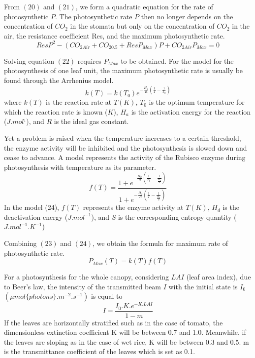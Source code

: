 \documentclass[a4paper]{article}
\begin{document}
From $(20)$ and $(21)$, we form a quadratic equation for the rate of photosynthetic $P$. The photosynthetic rate $P$ then no longer depends on the concentration of $CO_2$ in the stomata but only on the concentration of $CO_2$ in the air, the resistance coefficient Res, and the maximum photosynthetic rate.
\begin{equation}
  ResP^2 - (CO_{2Air} + CO_{2 0.5} + ResP_{Max})P + CO_{2Air}P_{Max} = 0
\end{equation}

Solving equation $(22)$ requires $P_{Max}$ to be obtained. For the model for the photosynthesis of one leaf unit, the maximum photosynthetic rate is usually be found through the Arrhenius model.
\begin{equation}
  k(T) = k(T_0)e^{-\frac{H_a}{R}(\frac{1}{T} - \frac{1}{T_0})}
\end{equation}
where $k(T)$ is the reaction rate at $T (K)$, $T_0$ is the optimum temperature for which the reaction
rate is known ($K$), $H_a$ is the activation energy for the reaction ($J.mol^{_1}$), and $R$ is the ideal gas constant.

Yet a problem is raised when the temperature increases to a certain threshold, the enzyme activity will be inhibited and the photosynthesis is slowed down and cease to advance. A model represents the activity of the Rubisco enzyme during photosynthesis with temperature as its parameter.
\begin{equation}
  f(T) = \frac{1 + e^{-\frac{H_d}{R}( \frac{1}{T_0} - \frac{1}{\frac{H_d}{S}} )}}{1 + e^{-\frac{H_d}{R}(\frac{1}{T} - \frac{1}{\frac{H_d}{S}})}}
\end{equation}
In the model (24), $f(T)$ represents the enzyme activity at $T (K)$, $H_d$ is the deactivation energy ($J.mol^{-1}$), and $S$ is the corresponding entropy quantity ($J.mol^{-1}.K^{-1}$)

Combining $(23)$ and $(24)$, we obtain the formula for maximum rate of photosynthetic rate.
\begin{equation}
  P_{Max}(T) = k(T)f(T)
\end{equation}

For a photosynthesis for the whole canopy, considering $LAI$ (leaf area index), due to Beer's law, the intensity of the transmitted beam $I$ with the initial state is $I_0$ $(\mu mol\{photons\}.m^{-2}.s^{-1})$ is equal to
\begin{equation}
  I = \frac{I_0.K.e^{-K.LAI}}{1 - m}
\end{equation}
If the leaves are horizontally stratified such as in the case of tomato, the dimensionless extinction coefficient K will be between 0.7 and 1.0. Meanwhile, if the leaves are sloping as in the case of wet rice, K will be between 0.3 and 0.5. m is the transmittance coefficient of the leaves which is set as 0.1.
\end{document}
